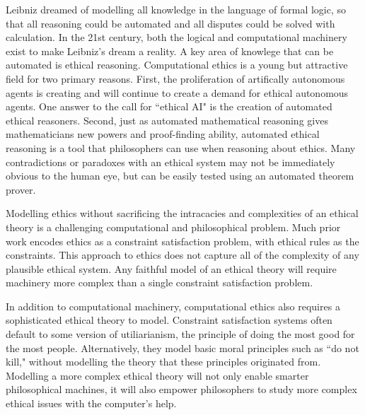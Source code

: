%
\begin{isabellebody}%
%
%
\isadelimtheory
%
\endisadelimtheory
%
\isatagtheory
%
\endisatagtheory
{\isafoldtheory}%
%
\isadelimtheory
%
\endisadelimtheory
%
\isadelimdocument
%
\endisadelimdocument
%
\isatagdocument
%
\isamarkuptrue%
%
\endisatagdocument
{\isafolddocument}%
%
\isadelimdocument
%
\endisadelimdocument
%
\begin{isamarkuptext}%
Leibniz dreamed of modelling all knowledge in the language of formal logic, so that all 
reasoning could be automated and all disputes could be solved with calculation. In the 21st 
century, both the logical and computational machinery exist to make Leibniz's dream a reality. A
key area of knowlege that can be automated is ethical reasoning. Computational 
ethics is a young but attractive field for two primary reasons. First, the proliferation of 
artifically autonomous agents is creating and will continue to create a demand for 
ethical autonomous agents. One answer to the call for ``ethical AI" is the creation 
of automated ethical reasoners. Second, just as automated mathematical reasoning gives mathematicians
new powers and proof-finding ability, automated ethical reasoning is a tool that philosophers can use 
when reasoning about ethics. Many contradictions or paradoxes with an ethical system may not be 
immediately obvious to the human eye, but can be easily tested using an automated theorem prover.

Modelling ethics without sacrificing the intracacies and complexities of an ethical theory is a 
challenging computational and philosophical problem. Much prior work encodes ethics as a constraint 
satisfaction problem, with ethical rules as the constraints. This approach to ethics does not capture 
all of the complexity of any plausible ethical system. Any faithful model of an ethical theory will 
require machinery more complex than a single constraint satisfaction problem.

In addition to computational machinery, computational ethics also requires a sophisticated 
ethical theory to model. Constraint satisfaction systems often default to some version of utiliarianism, 
the principle of doing the most good for the most people. Alternatively, they model basic moral 
principles such as ``do not kill," without modelling the theory that these principles originated from.
Modelling a more complex ethical theory will not only enable smarter philosophical machines, it will
also empower philosophers to study more complex ethical issues with the computer's help.


\end{isamarkuptext}
\end{isabellebody}

